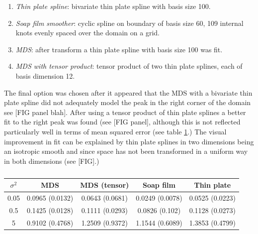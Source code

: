 \documentclass[a4paper,10pt]{article}
\begin{document}
\begin{enumerate}
\item \emph{Thin plate spline}: bivariate thin plate spline with basis size 100. 
\item \emph{Soap film smoother}: cyclic spline on boundary of basis size 60, 109 internal knots evenly spaced over the domain on a grid.
\item \emph{MDS}: after transform a thin plate spline with basis size 100 was fit. 
\item \emph{MDS with tensor product}: tensor product of two thin plate splines, each of basis dimension 12.
\end{enumerate} 

The final option was chosen after it appeared that the MDS with a bivariate thin plate spline did not adequately model the peak in the right corner of the domain see [FIG panel blah]. After using a tensor product of thin plate splines a better fit to the right peak was found (see [FIG panel], although this is not reflected particularly well in terms of mean squared error (see table \ref{wt2resultstable}.) The visual improvement in fit can be explained by thin plate splines in two dimensions being an isotropic smooth and since space has not been transformed in a uniform way in both dimensions (see [FIG].)

\begin{table}[ht]
\centering
\begin{tabular}{c || c c c c}
$\sigma^2$ & MDS & MDS (tensor) & Soap film & Thin plate\\ 
\hline
0.05 & 0.0965 (0.0132) & 0.0643 (0.0681) & 0.0249 (0.0078) & 0.0525 (0.0223)\\ 
0.5 & 0.1425 (0.0128) & 0.1111 (0.0293) & 0.0826 (0.102) & 0.1128 (0.0273)\\ 
5 & 0.9102 (0.4768) & 1.2509 (0.9372) & 1.1544 (0.6089) & 1.3853 (0.4799)\\ 
\end{tabular}
\label{wt2resultstable}
\caption{}
\end{table}
\end{document}
